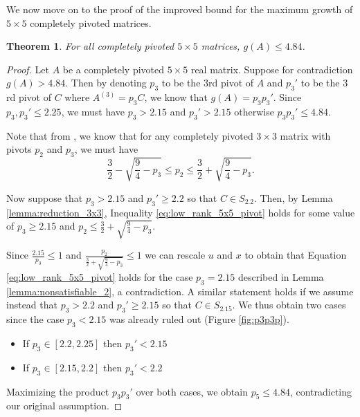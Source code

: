 \documentclass[reqno]{amsart}
\numberwithin{equation}{section}
\newtheorem{theorem}{Theorem}[section]
\begin{document}
We now move on to the proof of the improved bound for the maximum growth of $5 \times 5$ completely pivoted matrices. 
\begin{theorem}\label{thm:484}
    For all completely pivoted $5 \times 5$ matrices, $g(A) \leq 4.84$.
\end{theorem}
\begin{proof}
    Let $A$ be a completely pivoted $5 \times 5$ real matrix. Suppose for contradiction $g(A) > 4.84$. Then by denoting $p_3$ to be the $3$rd pivot of $A$ and $p_3'$ to be the $3$rd pivot of $C$ where $A^{(3)} = p_3 C$, we know that $g(A) = p_3 p_3'$. Since $p_3, p_3' \leq 2.25$, we must have $p_3 > 2.15$ and $p_3' > 2.15$ otherwise $p_3 p_3' \leq 4.84$.


    
    
    Note that from \cite{cohen1974note}, we know that for any completely pivoted $3 \times 3$ matrix with pivots $p_2$ and $p_3$, we must have 
    \begin{equation}
        \frac 32 - \sqrt{\frac 94 - p_3} \leq p_2 \leq \frac 32 + \sqrt{\frac 94 - p_3} .
    \end{equation}

    Now suppose that $p_3 > 2.15$ and $p_3' \geq 2.2$ so that $C \in S_{2.2}$. Then, by Lemma \ref{lemma:reduction_3x3}, Inequality \eqref{eq:low_rank_5x5_pivot} holds for some value of $p_3 \geq 2.15$ and $p_2 \leq \frac 32 + \sqrt{\frac 94 - p_3}$.

    Since $\frac{2.15}{p_3} \leq 1$ and $\frac{p_2}{ \frac 32 + \sqrt{\frac 94 - p_3}}\leq 1$ we can rescale $u$ and $x$ to obtain that Equation \ref{eq:low_rank_5x5_pivot} holds for the case $p_3 = 2.15$ described in Lemma \ref{lemma:nonsatisfiable_2}, a contradiction. A similar statement holds if we assume instead that $p_3 > 2.2$ and $p_3' \geq 2.15$ so that $C \in S_{2.15}$. We thus obtain two cases since the case $p_3 < 2.15$ was already ruled out (Figure \ref{fig:p3p3p}).
    \begin{itemize}
        \item If $p_3 \in [2.2, 2.25]$ then $p_3' < 2.15$
        \item If $p_3 \in [2.15, 2.2]$ then $p_3' < 2.2$
    \end{itemize}
    Maximizing the product $p_3 p_3'$ over both cases, we obtain $p_5 \leq 4.84$, contradicting our original assumption.
\end{proof}
\end{document}
